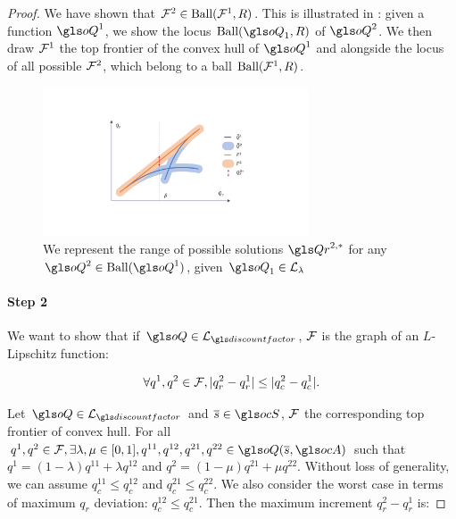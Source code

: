 \begin{proof}

    We have shown that $\mathcal{F}^2 \in \text{Ball}(\mathcal{F}^1, R)$.
    This is illustrated in : given a function $\oQ^1$, we show the locus $\text{Ball}(\oQ_1,R)$ of $\oQ^2$. We then draw $\mathcal{F}^1$ the top frontier of the convex hull of $\oQ^1$ and alongside the locus of all possible $\mathcal{F}^2$, which belong to a ball $\text{Ball}(\mathcal{F}^1, R)$.

    \begin{figure}[ht]
        \centering
        \includegraphics[trim=7cm 4cm 7cm 4cm, clip, width=0.7\textwidth]{sources/appendix/source/img/contraction_lipschitz.pdf}
        \caption{We represent the range of possible solutions $\Qr^{2,*}$ for any $\oQ^2\in\text{Ball}(\oQ^1)$, given $\oQ_1\in\cL_\lambda$}
        \label{fig:contraction_lips_hull}
    \end{figure}

    \paragraph{Step 2}

    We want to show that if $\oQ\in\cL_{\discountfactor}$, $\mathcal{F}$ is the graph of an $L$-Lipschitz function:

    \begin{equation}
        \label{eq:L-lip-set}
        \forall q^1,q^2\in\mathcal{F}, |q_r^2-q_r^1| \leq |q_c^2-q_c^1|.
    \end{equation}

    Let $\oQ\in\cL_{\discountfactor}$ and $\os\in\ocS$, $\mathcal{F}$ the corresponding top frontier of convex hull.
    For all $q^1,q^2\in\cF, \exists \lambda,\mu\in[0,1], q^{11},q^{12},q^{21},q^{22}\in \oQ(\os,\ocA)$ such that $q^1 = (1-\lambda)q^{11} + \lambda q^{12}$ and $q^2 = (1-\mu)q^{21} + \mu q^{22}$.
    Without loss of generality, we can assume $q_c^{11}\leq q_c^{12}$ and $q_c^{21}\leq q_c^{22}$. We also consider the worst case in terms of maximum $q_r$ deviation: $q_c^{12} \leq q_c^{21}$.
    Then the maximum increment $q_r^2-q_r^{1}$ is:


\end{proof}
